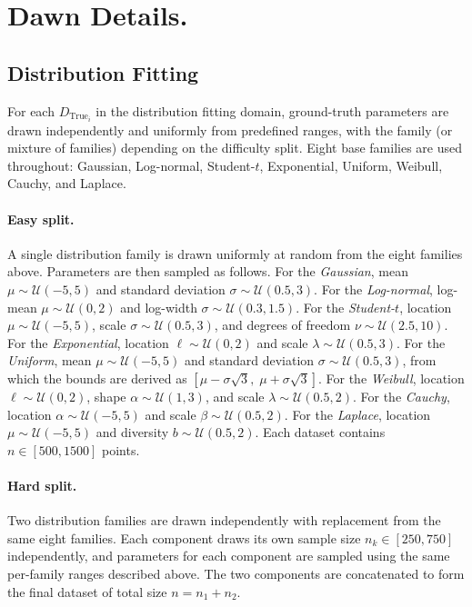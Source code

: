 \documentclass{article}
\newcommand{\data}{{\sc Dawn}}
\begin{document}
\section{\data{} Details.}
\label{app:data_details}
\subsection{Distribution Fitting}
For each $D_{\text{True}_i}$ in the distribution fitting domain, ground-truth
parameters are drawn independently and uniformly from predefined ranges, with
the family (or mixture of families) depending on the difficulty split. Eight
base families are used throughout: Gaussian, Log-normal, Student-$t$,
Exponential, Uniform, Weibull, Cauchy, and Laplace.

\paragraph{Easy split.}
A single distribution family is drawn uniformly at random from the eight
families above. Parameters are then sampled as follows. For the
\emph{Gaussian}, mean $\mu \sim \mathcal{U}(-5, 5)$ and standard deviation
$\sigma \sim \mathcal{U}(0.5, 3)$. For the \emph{Log-normal}, log-mean
$\mu \sim \mathcal{U}(0, 2)$ and log-width $\sigma \sim \mathcal{U}(0.3,
1.5)$. For the \emph{Student-$t$}, location $\mu \sim \mathcal{U}(-5, 5)$,
scale $\sigma \sim \mathcal{U}(0.5, 3)$, and degrees of freedom $\nu \sim
\mathcal{U}(2.5, 10)$. For the \emph{Exponential}, location $\ell \sim
\mathcal{U}(0, 2)$ and scale $\lambda \sim \mathcal{U}(0.5, 3)$. For the
\emph{Uniform}, mean $\mu \sim \mathcal{U}(-5, 5)$ and standard deviation
$\sigma \sim \mathcal{U}(0.5, 3)$, from which the bounds are derived as
$[\mu - \sigma\sqrt{3},\; \mu + \sigma\sqrt{3}]$. For the \emph{Weibull},
location $\ell \sim \mathcal{U}(0, 2)$, shape $\alpha \sim \mathcal{U}(1, 3)$,
and scale $\lambda \sim \mathcal{U}(0.5, 2)$. For the \emph{Cauchy}, location
$\alpha \sim \mathcal{U}(-5, 5)$ and scale $\beta \sim \mathcal{U}(0.5, 2)$.
For the \emph{Laplace}, location $\mu \sim \mathcal{U}(-5, 5)$ and diversity
$b \sim \mathcal{U}(0.5, 2)$. Each dataset contains $n \in [500, 1500]$ points.

\paragraph{Hard split.}
Two distribution families are drawn independently with replacement from the
same eight families. Each component draws its own sample size $n_k \in [250,
750]$ independently, and parameters for each component are sampled using the
same per-family ranges described above. The two components are concatenated to
form the final dataset of total size $n = n_1 + n_2$.
\end{document}
